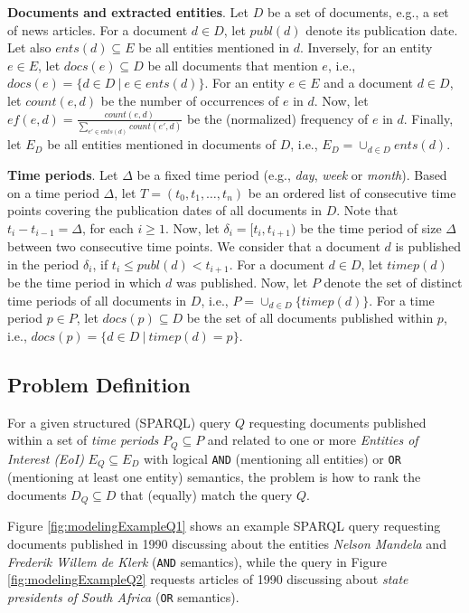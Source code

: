 \documentclass[runningheads,a4paper]{libtex/llncs}
\newcommand{\q}[1]{\lq\lq{}{}#1\rq\rq{}{}}
\begin{document}
\vspace{2mm} \noindent
{\bf Documents and extracted entities}.
Let $D$ be a set of documents, e.g., a set of news articles.
For a document $d \in D$, let $publ(d)$ denote its publication date.
Let also  $ents(d) \subseteq E$ be all entities mentioned in $d$.
Inversely, for an entity $e \in E$, let $docs(e) \subseteq D$
be all documents that mention $e$, i.e., $docs(e) = \{d \in D ~|~ e \in ents(d)\}$.
For an entity $e \in E$ and a document $d \in D$,
let $count(e, d)$ be the number of occurrences of $e$ in $d$.
Now, let $ef(e, d) = \frac{count(e, d)}{\sum_{e' \in ents(d)}{count(e', d)}}$ be the
(normalized) frequency of $e$ in $d$.
Finally, let $E_D$ be all entities mentioned in documents of $D$,
i.e., $E_D = \cup_{d \in D}{ents(d)}$.

\vspace{2mm} \noindent
{\bf Time periods}.
Let $\Delta$ be a fixed time period (e.g., {\em day}, {\em week} or {\em month}).
Based on a time period $\Delta$,
let $T = (t_0, t_1, \dots, t_n)$ be an ordered list of consecutive time points
covering the publication dates of all documents in $D$.
Note that $t_i - t_{i-1} = \Delta$, for each $i \geq 1$.
Now, let $\delta_i = [t_i, t_{i+1})$ be the time period of size $\Delta$ between two consecutive time points.
We consider that a document $d$ is published in the period $\delta_i$, if $t_i \leq publ(d) < t_{i+1}$.
For a document $d \in D$, let $timep(d)$ be the time period in which $d$ was published.
Now, let $P$ denote the set of distinct time periods of all documents in $D$, i.e., $P = \cup_{d \in D}{\{timep(d)\}}$.
For a time period $p \in P$, let $docs(p) \subseteq D$ be the set of all
documents published within $p$, i.e., $docs(p) = \{d \in D ~|~ timep(d) = p\}$.

\subsection{Problem Definition}
For a given structured (SPARQL) query $Q$ requesting documents
published within a set of {\em time periods} $P_Q \subseteq P$ and
related to one or more {\em Entities of Interest (EoI)} $E_Q \subseteq E_D$
with logical {\tt AND} (mentioning all entities) or {\tt OR} (mentioning at least one entity) semantics,
the problem is how to rank the documents $D_Q \subseteq D$ that (equally) match the query $Q$.

Figure \ref{fig:modelingExampleQ1} shows an example SPARQL query
requesting documents published in 1990
discussing about the entities {\em Nelson Mandela} %
and {\em Frederik Willem de Klerk} %
({\tt AND} semantics),
while the query in Figure \ref{fig:modelingExampleQ2} requests
articles of 1990 discussing about {\em state presidents of South Africa}
({\tt OR} semantics).
\end{document}
